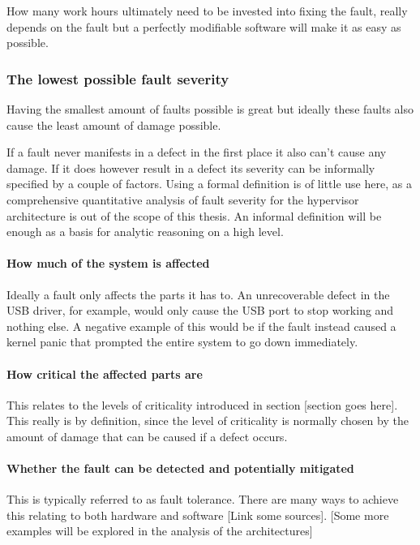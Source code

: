 How many work hours ultimately need to be invested into fixing the fault, really depends on the fault but a perfectly modifiable software will make it as easy as possible.
\subsubsection{The lowest possible fault severity}
Having the smallest amount of faults possible is great but ideally these faults also cause the least amount of damage possible. 

If a fault never manifests in a defect in the first place it also can't cause any damage. If it does however result in a defect its severity can be informally specified by a couple of factors. Using a formal definition is of little use here, as a comprehensive quantitative analysis of fault severity for the hypervisor architecture is out of the scope of this thesis. An informal definition will be enough as a basis for analytic reasoning on a high level.
\paragraph{How much of the system is affected}
Ideally  a fault only affects the parts it has to. An unrecoverable defect in the USB driver, for example, would only cause the USB port to stop working and nothing else. A negative example of this would be if the fault instead caused a kernel panic that prompted the entire system to go down immediately.
\paragraph{How critical the affected parts are}
This relates to the levels of criticality introduced in section [section goes here]. This really is by definition, since the level of criticality is normally chosen by the amount of damage that can be caused if a defect occurs. 
\paragraph{Whether the fault can be detected and potentially mitigated}
This is typically referred to as fault tolerance. There are many ways to achieve this relating to both hardware and software [Link some sources]. [Some more examples will be explored in the analysis of the architectures]


